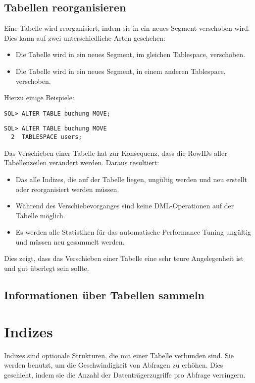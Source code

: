       \subsection{Tabellen reorganisieren}
        Eine Tabelle wird reorganisiert, indem sie in ein neues Segment verschoben wird. Dies kann auf zwei unterschiedliche Arten geschehen:
        \begin{itemize}
          \item Die Tabelle wird in ein neues Segment, im gleichen Tablespace, verschoben.
          \item Die Tabelle wird in ein neues Segment, in einem anderen Tablespace, verschoben.
        \end{itemize}
        Hierzu einige Beispiele:
        \begin{lstlisting}[caption={Reorganisieren der Tabelle \identifier{Buchung}},label=admin310,language=oracle_sql]
SQL> ALTER TABLE buchung MOVE;
        \end{lstlisting}
        \begin{lstlisting}[caption={Verschieben einer Tabelle in einen anderen Tablespace},label=admin311,language=oracle_sql]
SQL> ALTER TABLE buchung MOVE
  2  TABLESPACE users;
        \end{lstlisting}
        Das Verschieben einer Tabelle hat zur Konsequenz, dass die RowIDs aller Tabellenzeilen verändert werden. Daraus resultiert:
        \begin{itemize}
          \item Das alle Indizes, die auf der Tabelle liegen, ungültig werden und neu erstellt oder reorganisiert werden müssen.
          \item Während des Verschiebevorganges sind keine DML-Operationen auf der Tabelle mög\-lich.
          \item Es werden alle Statistiken für das automatische Performance Tuning ungültig und müssen neu gesammelt werden.
        \end{itemize}
        Dies zeigt, dass das Verschieben einer Tabelle eine sehr teure Angelegenheit ist und gut überlegt sein sollte.
      \subsection{Informationen über Tabellen sammeln}
        \begin{literaturinternet}
          \item \cite{ADMIN015}
        \end{literaturinternet}
    \section{Indizes}
      Indizes sind optionale Strukturen, die mit einer Tabelle verbunden sind. Sie werden benutzt, um die Geschwindigkeit von Abfragen zu erhöhen. Dies geschieht, indem sie die Anzahl der Datenträgerzugriffe pro Abfrage verringern.

